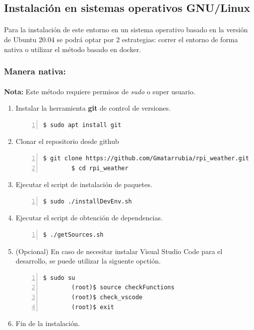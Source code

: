 \subsection{Instalación en sistemas operativos GNU/Linux}

\paragraph{}Para la instalación de este entorno en un sistema operativo basado en
la versión de Ubuntu 20.04 se podrá optar por 2 estrategias: correr el entorno de
forma nativa o utilizar el método basado en docker.

\subsubsection{Manera nativa:}

\paragraph{}\textbf{Nota:} Este método requiere permisos de \emph{sudo} o super usuario.

\begin{enumerate}
    \item Instalar la herramienta \textbf{\gls{git}} de control de versiones.
    \begin{lstlisting}[style=consola, numbers=left]
        $ sudo apt install git
    \end{lstlisting}

    \item Clonar el repositorio desde github
    \begin{lstlisting}[style=consola, numbers=left]
        $ git clone https://github.com/Gmatarrubia/rpi_weather.git
        $ cd rpi_weather
    \end{lstlisting}

    \item Ejecutar el script de instalación de paquetes.
    \begin{lstlisting}[style=consola, numbers=left]
        $ sudo ./installDevEnv.sh
    \end{lstlisting}

    \item Ejecutar el script de obtención de dependencias.
    \begin{lstlisting}[style=consola, numbers=left]
        $ ./getSources.sh
    \end{lstlisting}

    \item (Opcional) En caso de necesitar instalar Visual Studio Code para el desarrollo,
    se puede utilizar la siguente opctión.
    \begin{lstlisting}[style=consola, numbers=left]
        $ sudo su
        (root)$ source checkFunctions
        (root)$ check_vscode
        (root)$ exit
    \end{lstlisting}

    \item Fin de la instalación.
\end{enumerate}

